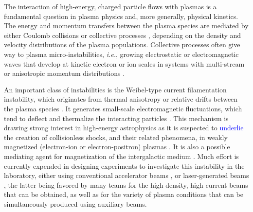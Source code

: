 \documentclass[aps,twocolumn,showpacs,superscriptaddress]{revtex4}
\begin{document}
The interaction of high-energy, charged particle flows with plasmas is a fundamental question in plasma physics and, more generally, physical kinetics. The energy and momentum transfers between the plasma species are mediated by either Coulomb collisions \cite{Shkarofsky_1966} or collective processes \cite{Belmont_2013}, depending on the density and velocity distributions of the plasma populations. Collective processes often give way to plasma micro-instabilities, \emph{i.e.}, growing electrostatic or electromagnetic waves that develop at kinetic electron or ion scales in systems with multi-stream or anisotropic momentum distributions \cite{Davidson_1983}. 

An important class of instabilities is the Weibel-type current filamentation instability, which originates from thermal anisotropy \cite{PRL_Weibel_1959} or relative drifts between the plasma species \cite{POF_Fried_1959}. It generates small-scale electromagnetic fluctuations, which tend to deflect and thermalize the interacting particles \cite{POF_Davidson_1972, PRL_Lee_1973, APJ_Jaroschek_2004, PRL_Adam_2006}. This mechanism is drawing strong interest in high-energy astrophysics as it is suspected to \textcolor{blue}{underlie} the creation of collisionless shocks, and their related phenomena, in weakly magnetized (electron-ion or electron-positron) plasmas \cite{RPP_Marcowith_2016}. It is also a possible mediating agent for magnetization of the intergalactic medium \cite{APJ_Schlickeiser_2003}.
%
Much effort is currently expended in designing experiments to investigate this instability in the laboratory, either using conventional accelerator beams \cite{PRL_Allen_2012}, or laser-generated beams \cite{PRL_Fox_2013,NP_Huntington_2015},
the latter being favored by many teams for the high-density, high-current beams that can be obtained, as well as for the variety of plasma conditions that can be simultaneously produced using auxiliary beams. 
\end{document}
